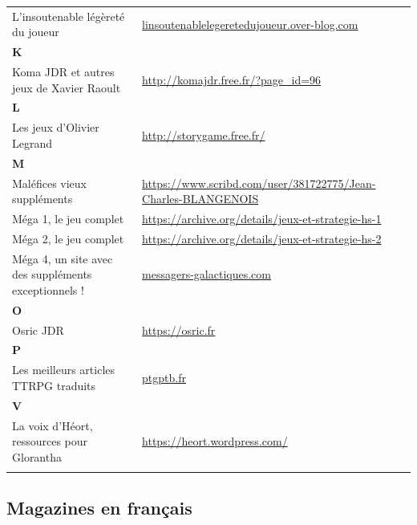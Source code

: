 \documentclass[a4paper, 11pt, twoside]{article}
\begin{document}
\begin{longtable}{p{7cm}p{7cm}}
L'insoutenable légèreté du joueur & \href{http://linsoutenablelegeretedujoueur.over-blog.com/}{linsoutenablelegeretedujoueur.over-blog.com}\\
\textbf{K} & \\
Koma JDR et autres jeux de Xavier Raoult & \url{http://komajdr.free.fr/?page\_id=96}\\
\textbf{L} & \\
Les jeux d'Olivier Legrand & \url{http://storygame.free.fr/}\\
\textbf{M} & \\
Maléfices vieux suppléments & \url{https://www.scribd.com/user/381722775/Jean-Charles-BLANGENOIS}\\
Méga 1, le jeu complet & \url{https://archive.org/details/jeux-et-strategie-hs-1}\\
Méga 2, le jeu complet & \url{https://archive.org/details/jeux-et-strategie-hs-2}\\
Méga 4, un site avec des suppléments exceptionnels ! & \href{https://www.messagers-galactiques.com}{messagers-galactiques.com}\\
\textbf{O} & \\
Osric JDR & \url{https://osric.fr}\\
\textbf{P} & \\
Les meilleurs articles TTRPG traduits & \href{https://ptgptb.fr}{ptgptb.fr}\\
\textbf{V} & \\
La voix d'Héort, ressources pour Glorantha & \url{https://heort.wordpress.com/}\\
 & \\
\end{longtable}

\subsection{Magazines en français}
\label{sec:org481ac96}
\end{document}
